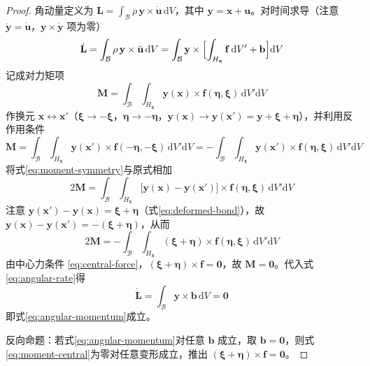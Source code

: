 \begin{proof}
  角动量定义为 $\mathbf{L}=\int_{\mathcal{B}}\rho\,\mathbf{y}\times\dot{\mathbf{u}}\,\mathrm{d}V$，其中 $\mathbf{y}=\mathbf{x}+\mathbf{u}$。对时间求导（注意 $\dot{\mathbf{y}}=\dot{\mathbf{u}}$，$\mathbf{y}\times\dot{\mathbf{y}}$ 项为零）
  \begin{equation}
    \dot{\mathbf{L}}=\int_{\mathcal{B}}\rho\,\mathbf{y}\times\ddot{\mathbf{u}}\,\mathrm{d}V=\int_{\mathcal{B}}\mathbf{y}\times\Bigl[\int_{H_{\mathbf{x}}}\mathbf{f}\,\mathrm{d}V'+\mathbf{b}\Bigr]\mathrm{d}V
    \label{eq:angular-rate}
  \end{equation}
  记成对力矩项
  \[
    \mathbf{M}=\int_{\mathcal{B}}\int_{H_{\mathbf{x}}}\mathbf{y}(\mathbf{x})\times\mathbf{f}(\boldsymbol{\eta},\boldsymbol{\xi})\,\mathrm{d}V'\mathrm{d}V
  \]
  作换元 $\mathbf{x}\leftrightarrow\mathbf{x}'$（$\boldsymbol{\xi}\to-\boldsymbol{\xi}$，$\boldsymbol{\eta}\to-\boldsymbol{\eta}$，$\mathbf{y}(\mathbf{x})\to\mathbf{y}(\mathbf{x}')=\mathbf{y}+\boldsymbol{\xi}+\boldsymbol{\eta}$），并利用反作用条件
  \begin{equation}
    \mathbf{M}=\int_{\mathcal{B}}\int_{H_{\mathbf{x}}}\mathbf{y}(\mathbf{x}')\times\mathbf{f}(-\boldsymbol{\eta},-\boldsymbol{\xi})\,\mathrm{d}V'\mathrm{d}V=-\int_{\mathcal{B}}\int_{H_{\mathbf{x}}}\mathbf{y}(\mathbf{x}')\times\mathbf{f}(\boldsymbol{\eta},\boldsymbol{\xi})\,\mathrm{d}V'\mathrm{d}V
    \label{eq:moment-symmetry}
  \end{equation}
  将式\eqref{eq:moment-symmetry}与原式相加
  \[
    2\mathbf{M}=\int_{\mathcal{B}}\int_{H_{\mathbf{x}}}\bigl[\mathbf{y}(\mathbf{x})-\mathbf{y}(\mathbf{x}')\bigr]\times\mathbf{f}(\boldsymbol{\eta},\boldsymbol{\xi})\,\mathrm{d}V'\mathrm{d}V
  \]
  注意 $\mathbf{y}(\mathbf{x}')-\mathbf{y}(\mathbf{x})=\boldsymbol{\xi}+\boldsymbol{\eta}$（式\eqref{eq:deformed-bond}），故 $\mathbf{y}(\mathbf{x})-\mathbf{y}(\mathbf{x}')=-(\boldsymbol{\xi}+\boldsymbol{\eta})$，从而
  \begin{equation}
    2\mathbf{M}=-\int_{\mathcal{B}}\int_{H_{\mathbf{x}}}(\boldsymbol{\xi}+\boldsymbol{\eta})\times\mathbf{f}(\boldsymbol{\eta},\boldsymbol{\xi})\,\mathrm{d}V'\mathrm{d}V
    \label{eq:moment-central}
  \end{equation}
  由中心力条件 \eqref{eq:central-force}，$(\boldsymbol{\xi}+\boldsymbol{\eta})\times\mathbf{f}=\mathbf{0}$，故 $\mathbf{M}=\mathbf{0}$。代入式\eqref{eq:angular-rate}得
  \[
    \dot{\mathbf{L}}=\int_{\mathcal{B}}\mathbf{y}\times\mathbf{b}\,\mathrm{d}V=\mathbf{0}
  \]
  即式\eqref{eq:angular-momentum}成立。

  反向命题：若式\eqref{eq:angular-momentum}对任意 $\mathbf{b}$ 成立，取 $\mathbf{b}=\mathbf{0}$，则式\eqref{eq:moment-central}为零对任意变形成立，推出 $(\boldsymbol{\xi}+\boldsymbol{\eta})\times\mathbf{f}=\mathbf{0}$。
\end{proof}

